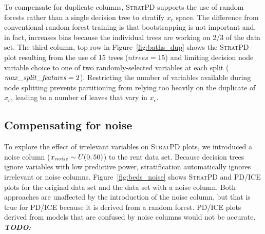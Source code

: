 \documentclass[12pt]{article}
\newcommand{\figref}[1]{Figure~\ref{#1}}
\newcommand{\cut}[1]{}
\newcommand{\todo}[1]{{\bf\em TODO:} {{\color{red}{#1}}}}
\newcommand{\spd}{\fontfamily{cmr}\textsc{\small StratPD}}
\newcommand{\xnc}{$x_{\overline{c}}$}
\begin{document}
\cut{
the reason that the ice plot is lowered is due to the data, which has very few data points in the high range of bedrooms. The average is maybe 1.2, so for roughly half the trees, the prediction will be for 1.2 bedrooms no matter what the duplicated bedroom column says.  This problem occurs for strongly predictive features in RF. Linear model couldn't handle duplicate column.}

To compensate for duplicate columns, \spd{} supports the use of random forests rather than a single decision tree to stratify \xnc{} space. The difference from conventional random forest training is that bootstrapping is not important and, in fact, increases bias because the individual trees are working on 2/3 of the data set. The third column, top row in \figref{fig:baths_dup} shows the \spd{} plot resulting from the use of 15 trees ($ntrees=15$) and limiting decision node variable choice to one of two randomly-selected variables at each split (${\it max\_split\_features}=2$).  Restricting the number of variables available during node splitting prevents partitioning from relying too heavily on the duplicate of $x_c$, leading to a number of leaves that vary in $x_c$.

\subsection{Compensating for noise}\label{sec:noise}

To explore the effect of irrelevant variables on \spd{} plots, we introduced a noise column ($x_{\it noise} \sim U(0,50)$) to the rent data set. Because decision trees ignore variables with low predictive power, stratification automatically ignores irrelevant or noise columns.  \figref{fig:beds_noise} shows \spd{} and PD/ICE plots for the original data set and the data set with a noise column. Both approaches are unaffected by the introduction of the noise column, but that is true for PD/ICE because it is derived from a random forest. PD/ICE plots derived from models that are confused by noise columns would not be accurate. \todo{why no 5-8 dots? ignored from binning; see section}
\end{document}
